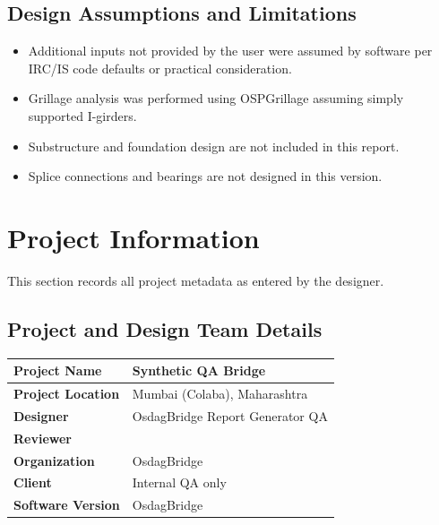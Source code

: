 \documentclass[12pt,a4paper]{report}
\numberwithin{table}{chapter}
\numberwithin{figure}{chapter}
\begin{document}
\section*{Design Assumptions and Limitations}
\label{sec:assumptions}

\begin{itemize}
\item Additional inputs not provided by the user were assumed by software per IRC/IS code defaults or practical consideration.
\item Grillage analysis was performed using OSPGrillage assuming simply supported I-girders.
\item Substructure and foundation design are not included in this report.
\item Splice connections and bearings are not designed in this version.
\end{itemize}

\titleformat{\chapter}[block]{\normalfont\Large\bfseries\centering}{\thechapter}{1em}{}
\titlespacing*{\chapter}{0pt}{-30pt}{10pt}


\chapter{Project Information}

This section records all project metadata as entered by the designer.

\section{Project and Design Team Details}
\label{sec:project-details}

\begin{tabular}{|L{5.5cm}|L{8.5cm}|}
\hline
\textbf{Project Name} & Synthetic QA Bridge \\
\hline
\textbf{Project Location} & Mumbai (Colaba), Maharashtra \\
\hline
\textbf{Designer} & OsdagBridge Report Generator QA \\
\hline
\textbf{Reviewer} &  \\
\hline
\textbf{Organization} & OsdagBridge \\
\hline
\textbf{Client} & Internal QA only \\
\hline
\textbf{Software Version} & OsdagBridge \\
\hline
\end{tabular}
\end{document}
